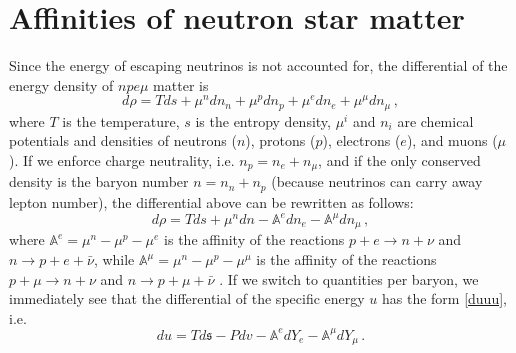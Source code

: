 \documentclass[a4paper, amsfonts, amssymb, amsmath, reprint, showkeys, nofootinbib, twoside, onecolumn,notitlepage]{revtex4-1}
\begin{document}
%



\section{Affinities of neutron star matter}\label{AAAAAAAAAAAA}

Since the energy of escaping neutrinos is not accounted for, the differential of the energy density of $npe\mu$ matter is 
\begin{equation}\label{npemu}
d\rho=Tds+\mu^n dn_n+\mu^pdn_p+\mu^e dn_e+\mu^\mu dn_\mu \, ,
\end{equation}
where $T$ is the temperature, $s$ is the entropy density, $\mu^i$ and $n_i$ are chemical potentials and densities of neutrons ($n$), protons ($p$), electrons ($e$), and muons ($\mu$). If we enforce charge neutrality, i.e. $n_p=n_e+n_\mu$, and if the only conserved density is the baryon number $n=n_n+n_p$ (because neutrinos can carry away lepton number), the differential above can be rewritten as follows:
\begin{equation}
d\rho= Tds+\mu^n dn-\mathbb{A}^edn_e-\mathbb{A}^\mu dn_\mu \, ,
\end{equation}
where $\mathbb{A}^e=\mu^n-\mu^p-\mu^e$ is the affinity of the reactions $p+e \rightarrow n+\nu$ and $n \rightarrow p+e+\bar{\nu}$, while $\mathbb{A}^\mu=\mu^n-\mu^p-\mu^\mu$ is the affinity of the reactions $p+\mu \rightarrow n+\nu$ and $n \rightarrow p+\mu+\bar{\nu}$ \cite{Camelio2022}. If we switch to quantities per baryon, we immediately see that the differential of the specific energy $u$ has the form \eqref{duuu}, i.e.
\begin{equation}
du = Td\mathfrak{s}-Pdv-\mathbb{A}^e dY_e-\mathbb{A}^\mu dY_\mu \, .
\end{equation}







\label{lastpage}
\end{document}
